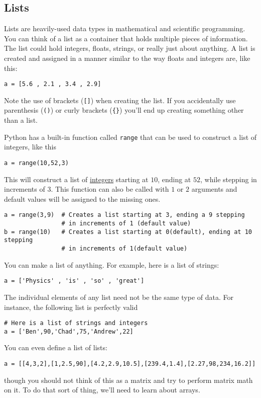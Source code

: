 \subsection*{Lists}
Lists are heavily-used data types in mathematical and
scientific programming.  You can think of a list as a
container that holds multiple pieces of information. The list could
hold integers, floats, strings, or really just about anything. A list
is created and assigned in a manner similar to the way floats and
integers are, like this:
\begin{Verbatim}
a = [5.6 , 2.1 , 3.4 , 2.9]
\end{Verbatim}
Note the use of brackets (\texttt{[]}) when creating the list. If you
accidentally use parenthesis (\texttt{()})
or curly brackets (\texttt{\{\}}) you'll end up creating something other
than a list.

\noindent Python has a built-in function called \texttt{range} that can be used
to construct a list of integers, like this
\begin{Verbatim}
a = range(10,52,3)  
\end{Verbatim}
This will construct a list of \ul{integers} starting at $10$, ending at
$52$, while stepping in increments of $3$. This function can also be
called with $1$ or $2$ arguments and default values will be assigned
to the missing ones.  
\begin{Verbatim}
a = range(3,9)  # Creates a list starting at 3, ending a 9 stepping
                # in increments of 1 (default value)
b = range(10)   # Creates a list starting at 0(default), ending at 10 stepping
                # in increments of 1(default value)
\end{Verbatim}
\noindent You can make a list of anything.  For example, here is a
list of strings:
\begin{Verbatim}
a = ['Physics' , 'is' , 'so' , 'great']
\end{Verbatim}
The individual elements of any list need not be the same type of
data.  For instance, the following list is perfectly valid
\begin{Verbatim}
# Here is a list of strings and integers
a = ['Ben',90,'Chad',75,'Andrew',22]  
\end{Verbatim}
You can even define a list of lists:
\begin{Verbatim}
a = [[4,3,2],[1,2.5,90],[4.2,2.9,10.5],[239.4,1.4],[2.27,98,234,16.2]]
\end{Verbatim}
though you should not think of this as a matrix and try to perform
matrix math on it. To do that sort of thing, we'll need to learn about
arrays.
